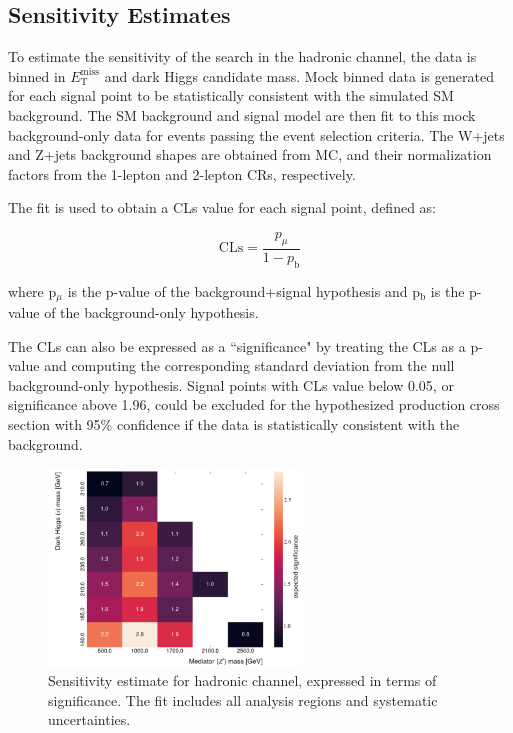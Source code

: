 \documentclass[12pt]{article}
\newcommand*{\met}{\ensuremath{E_\text{T}^\text{miss}} }
\begin{document}
\subsection{Sensitivity Estimates}

To estimate the sensitivity of the search in the hadronic channel, the data is binned in \met and dark Higgs candidate mass. Mock binned data is generated for each signal point to be statistically consistent with the simulated SM background. The SM background and signal model are then fit to this mock background-only data for events passing the event selection criteria. The W+jets and Z+jets background shapes are obtained from MC, and their normalization factors from the 1-lepton and 2-lepton CRs, respectively. 

The fit is used to obtain a CLs value \cite{PDG_stats} for each signal point, defined as:

\begin{equation}
\text{CLs} = \frac{p_\mu}{1-p_\text{b}}
\end{equation}

\noindent where p$_\mu$ is the p-value of the background+signal hypothesis and p$_\text{b}$ is the p-value of the background-only hypothesis. 

The CLs can also be expressed as a ``significance" by treating the CLs as a p-value and computing the corresponding standard deviation from the null background-only hypothesis. Signal points with CLs value below 0.05, or significance above 1.96, could be excluded for the hypothesized production cross section with 95\% confidence if the data is statistically consistent with the background. 

\begin{figure}[H]
     \centering
     \includegraphics[width=0.6\textwidth]{figures/had_sensitivity.png}
\caption[]{Sensitivity estimate for hadronic channel, expressed in terms of significance. The fit includes all analysis regions and systematic uncertainties.}
\label{fig:sensitivity}
\end{figure}
\end{document}
